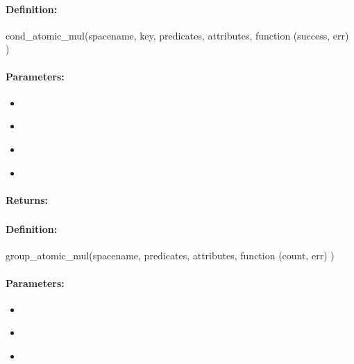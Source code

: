 \paragraph{Definition:}
\begin{javascriptcode}
cond_atomic_mul(spacename, key, predicates, attributes, function (success, err) {})
\end{javascriptcode}
\paragraph{Parameters:}
\begin{itemize}[noitemsep]
\item {}\\

\item {}\\

\item {}\\

\item {}\\

\end{itemize}

\paragraph{Returns:}


\pagebreak
\subsubsection{}
\label{api:nodejs:group_atomic_mul}


\paragraph{Definition:}
\begin{javascriptcode}
group_atomic_mul(spacename, predicates, attributes, function (count, err) {})
\end{javascriptcode}
\paragraph{Parameters:}
\begin{itemize}[noitemsep]
\item {}\\

\item {}\\

\item {}\\

\end{itemize}

